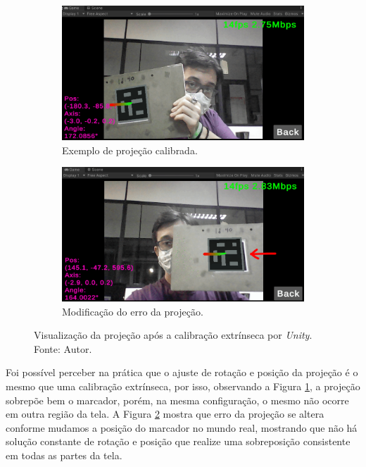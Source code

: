 \begin{figure}[H]
    \centering
    \begin{subfigure}{.45\textwidth}
        \centering
        \includegraphics[width=.95\linewidth]{figuras/vcranium-extr1.png}
        \caption{Exemplo de projeção calibrada.}
        \label{fig:extr1}
    \end{subfigure}
    \begin{subfigure}{.45\textwidth}
        \centering
        \includegraphics[width=.95\linewidth]{figuras/vcranium-extr2.png}
        \caption{Modificação do erro da projeção.}
        \label{fig:extr2}
    \end{subfigure}
    \caption{Visualização da projeção após a calibração extrínseca por \textit{Unity}. Fonte: Autor.}
    \label{fig:extr-comp}
\end{figure}

Foi possível perceber na prática que o ajuste de rotação e posição da projeção é o mesmo que uma calibração extrínseca, por isso, observando a Figura \ref{fig:extr1}, a projeção sobrepõe bem o marcador, porém, na mesma configuração, o mesmo não ocorre em outra região da tela. A Figura \ref{fig:extr2} mostra que erro da projeção se altera conforme mudamos a posição do marcador no mundo real, mostrando que não há solução constante de rotação e posição que realize uma sobreposição consistente em todas as partes da tela.

